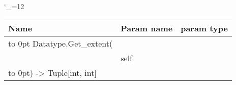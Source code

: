 \begingroup \catcode`\_=12 \tt
\begin{tabular}{lll}
\toprule
\textrm{Name}&\textrm{Param name}&\textrm{param type}\\
\midrule
\hbox to 0pt {Datatype.Get_extent(\hss}\\
& self\\
\hbox to 0pt{) -> Tuple[int, int]\hss}\\
\bottomrule
\end{tabular}
\endgroup
